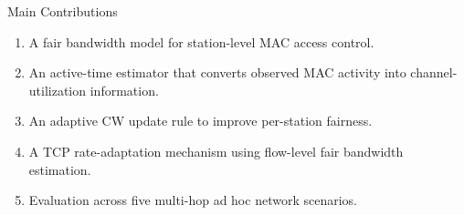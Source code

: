 \begin{frame}{Main Contributions}

\begin{enumerate}
    \item A fair bandwidth model for station-level MAC access control.

    \item An active-time estimator that converts observed MAC activity into channel-utilization information.

    \item An adaptive CW update rule to improve per-station fairness.

    \item A TCP rate-adaptation mechanism using flow-level fair bandwidth estimation.

    \item Evaluation across five multi-hop ad hoc network scenarios.
\end{enumerate}
\end{frame}
